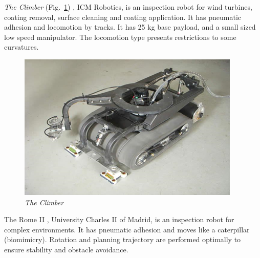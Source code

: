 \textit{The Climber} (Fig.~\ref{icm})
, ICM Robotics, is an inspection robot for
wind turbines, coating removal, surface cleaning and coating application.
It has pneumatic adhesion and locomotion by tracks. It has 25 kg base payload,
and a small sized low speed manipulator. The locomotion type presents
restrictions to some curvatures.


\begin{figure}[ht]
	\centering
	\includegraphics[scale=0.8]{figs/climbers/icm.png}
	\caption{\textit{The Climber}}
	\label{icm}
\end{figure}

The Rome II%
, University Charles II of Madrid, is an inspection robot for complex
environments. It has pneumatic adhesion and moves like a caterpillar
(biomimicry). Rotation and planning trajectory are performed optimally to
ensure stability and obstacle avoidance.

